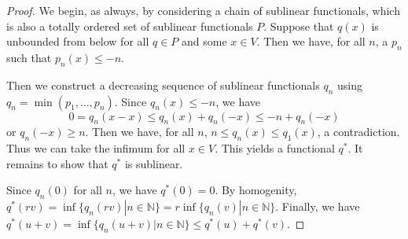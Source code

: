 \documentclass[twoside,symmetric, openany, 12pt]{./tuftebook}
\theoremstyle{definition}
\theoremstyle{definition}
\theoremstyle{definition}
\newcommand{\N}{\mathbb{N}}
\begin{document}
\begin{proof}
	We begin, as always, by considering a chain of sublinear functionals, which is also a totally ordered set of sublinear functionals $P$. Suppose that $q(x)$ is unbounded from below for all $q\in P$ and some $x\in V$. Then we have, for all $n$, a $p_n$ such that $p_n(x)\le -n$.

	Then we construct a decreasing sequence of sublinear functionals $q_n$ using $q_n=\min (p_1, \dots, p_n)$. Since $q_n(x)\le -n$, we have
	\[
	0=q_n(x-x)\le q_n(x)+q_n(-x)\le -n +q_n(-x)
	\]
	or $q_n(-x)\ge n$. Then we have, for all $n$, $n\le q_n(x)\le q_1(x)$, a contradiction. Thus we can take the infimum for all $x\in V$. This yields a functional $q^*$. It remains to show that $q^*$ is sublinear. 
	
	Since $q_n(0)$ for all $n$, we have $q^*(0)=0$. By homogenity, $q^*(rv)=\inf \{q_n(r v)|n \in \N\}= r \inf \{q_n(v)|n\in \N\} $. Finally, we have $q^*(u+v) = \inf \{q_n(u+v)|n\in \N\}\le q^*(u)+q^*(v)$.
	\end{proof}
	
\end{document}
